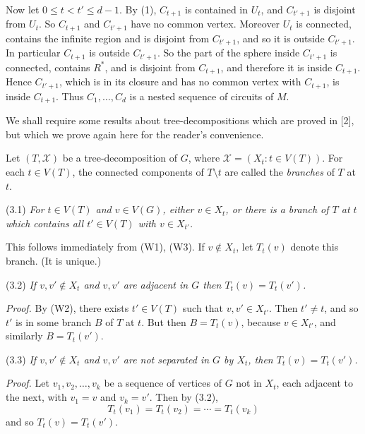 {Now let $0 \le t < t' \le d - 1$. By (1), $C_{t+1}$ is contained in $U_t$, and $C_{t'+1}$ is disjoint
from $U_t$. So $C_{t+1}$ and $C_{t'+1}$ have no common vertex. Moreover $U_t$ is connected, contains
the infinite region and is disjoint from $C_{t'+1}$, and so it is outside $C_{t'+1}$. In particular
$C_{t+1}$ is outside $C_{t'+1}$. So the part of the sphere inside $C_{t'+1}$ is connected, contains
$R^*$, and is disjoint from $C_{t+1}$, and therefore it is inside $C_{t+1}$. Hence $C_{t'+1}$, which is
in its closure and has no common vertex with $C_{t+1}$, is inside $C_{t+1}$. Thus $C_1, \dots, C_d$ is
a nested sequence of circuits of $M$.}


We shall require some results about tree-decompositions which are proved in [2], but which we prove again here for the reader's convenience.

Let $(T, \mathcal{X})$ be a tree-decomposition of $G$, where $\mathcal{X} = (X_t : t \in V(T))$. For each $t \in V(T)$, the connected components of $T \setminus t$ are called the \textit{branches} of $T$ at $t$.

\stmt
(3.1) \textit{For $t \in V(T)$ and $v \in V(G)$, either $v \in X_t$, or there is a branch of $T$ at $t$ which contains all $t' \in V(T)$ with $v \in X_{t'}$.}

This follows immediately from (W1), (W3). If $v \notin X_t$, let $T_t(v)$ denote this branch. (It is unique.)

\stmt
(3.2) \textit{If $v, v' \notin X_t$ and $v, v'$ are adjacent in $G$ then $T_t(v) = T_t(v')$.}

\textit{Proof.} By (W2), there exists $t' \in V(T)$ such that $v, v' \in X_{t'}$. Then $t' \ne t$, and so $t'$ is in some branch $B$ of $T$ at $t$. But then $B = T_t(v)$, because $v \in X_{t'}$, and similarly $B = T_t(v')$.

\stmt
(3.3) \textit{If $v, v' \notin X_t$ and $v, v'$ are not separated in $G$ by $X_t$, then $T_t(v) = T_t(v')$.}

\textit{Proof.} Let $v_1, v_2, \dots, v_k$ be a sequence of vertices of $G$ not in $X_t$, each adjacent to the next, with $v_1 = v$ and $v_k = v'$. Then by (3.2),
\begin{equation*}
T_t(v_1) = T_t(v_2) = \cdots = T_t(v_k)
\end{equation*}
and so $T_t(v) = T_t(v')$.
